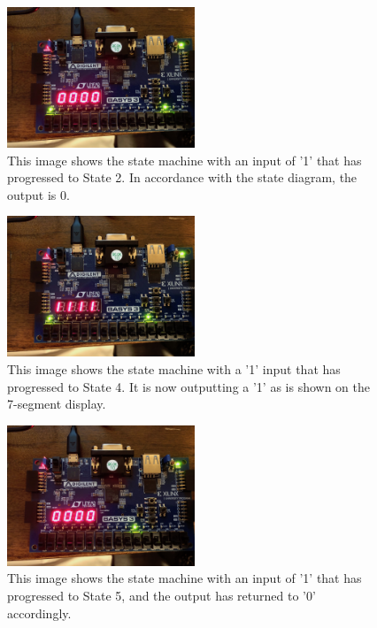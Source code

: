 \documentclass[11pt]{article}
\begin{document}
\begin{center}
\begin{figure}[H]
	\includegraphics[width=0.5\textwidth]{./images/Part2/IMG_0579.jpg}
	\caption{\label{fig:part2img2}This image shows the state machine with an input of '1' that has progressed to State 2. In accordance with the state diagram, the output is 0.}
\end{figure}
\end{center}

\begin{center}
\begin{figure}[H]
	\includegraphics[width=0.5\textwidth]{./images/Part2/IMG_0580.jpg}
	\caption{\label{fig:part2img3}This image shows the state machine with a '1' input that has progressed to State 4. It is now outputting a '1' as is shown on the 7-segment display.}
\end{figure}
\end{center}

\begin{center}
\begin{figure}[H]
	\includegraphics[width=0.5\textwidth]{./images/Part2/IMG_0581.jpg}
	\caption{\label{fig:part2img4}This image shows the state machine with an input of '1' that has progressed to State 5, and the output has returned to '0' accordingly.}
\end{figure}
\end{center}
\end{document}
